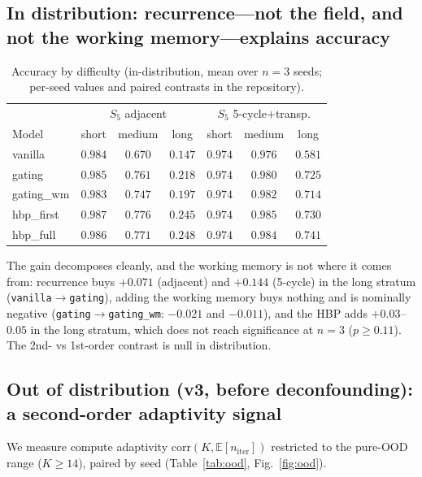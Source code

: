 \documentclass{article}
\begin{document}
\subsection{In distribution: recurrence---not the field, and not the working memory---explains accuracy}
\begin{table}[h]\centering
\caption{Accuracy by difficulty (in-distribution, mean over $n{=}3$ seeds;
per-seed values and paired contrasts in the repository).}
\begin{tabular}{lcccccc}
\toprule
& \multicolumn{3}{c}{$S_5$ adjacent} & \multicolumn{3}{c}{$S_5$ 5-cycle$+$transp.}\\
Model & short & medium & long & short & medium & long \\
\midrule
vanilla     & $0.984$ & $0.670$ & $0.147$ & $0.974$ & $0.976$ & $0.581$ \\
gating      & $0.985$ & $0.761$ & $0.218$ & $0.974$ & $0.980$ & $0.725$ \\
gating\_wm  & $0.983$ & $0.747$ & $0.197$ & $0.974$ & $0.982$ & $0.714$ \\
hbp\_first  & $0.987$ & $0.776$ & $0.245$ & $0.974$ & $0.985$ & $0.730$ \\
hbp\_full   & $0.986$ & $0.771$ & $0.248$ & $0.974$ & $0.984$ & $0.741$ \\
\bottomrule
\end{tabular}
\end{table}
The gain decomposes cleanly, and the working memory is not where it comes
from: recurrence buys $+0.071$ (adjacent) and $+0.144$ (5-cycle) in the long
stratum (\texttt{vanilla}$\to$\texttt{gating}), adding the working memory buys
nothing and is nominally negative (\texttt{gating}$\to$\texttt{gating\_wm}:
$-0.021$ and $-0.011$), and the HBP adds
$+0.03$--$0.05$ in the long stratum, which does not reach significance at
$n{=}3$ ($p\ge0.11$). The 2nd- vs 1st-order contrast is null in distribution.

\subsection{Out of distribution (v3, before deconfounding): a second-order adaptivity signal}
We measure compute adaptivity
$\mathrm{corr}(K,\mathbb{E}[n_{\mathrm{iter}}])$ restricted to the pure-OOD range
($K\ge14$), paired by seed (Table~\ref{tab:ood}, Fig.~\ref{fig:ood}).
\end{document}
